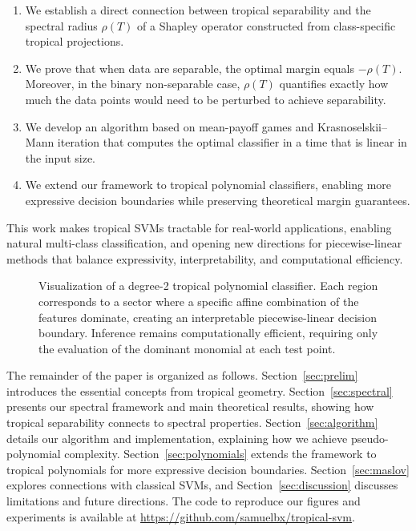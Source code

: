 \documentclass{article}
\begin{document}
\begin{enumerate}
    \item We establish a direct connection between tropical separability and the spectral radius $\rho(T)$ of a Shapley operator constructed from class-specific tropical projections.
    
    \item We prove that when data are separable, the optimal margin equals $-\rho(T)$. Moreover, in the binary non-separable case, $\rho(T)$ quantifies exactly how much the data points would need to be perturbed to achieve separability.
    
    \item We develop an algorithm based on mean-payoff games and Krasnoselskii--Mann iteration that computes the optimal classifier in a time that is linear in the input size. %
    
    \item We extend our framework to tropical polynomial classifiers, enabling more expressive decision boundaries while preserving theoretical margin guarantees.
\end{enumerate}

This work makes tropical SVMs tractable for real-world applications, enabling natural multi-class classification, and opening new directions for piecewise-linear methods that balance expressivity, interpretability, and computational efficiency.

\begin{figure}[h]
    \centering
    \resizebox{0.99\textwidth}{!}{\clipbox{0.15\width{} 0.30\height{} 0.15\width{} 0.30\height{}}{}}
    \caption{Visualization of a degree-2 tropical polynomial classifier. Each region corresponds to a sector where a specific affine combination of the features dominate, creating an interpretable piecewise-linear decision boundary. Inference remains computationally efficient, requiring only the evaluation of the dominant monomial at each test point.}
    \label{fig:tropical_hyperplane}
\end{figure}

The remainder of the paper is organized as follows. Section~\ref{sec:prelim} introduces the essential concepts from tropical geometry. Section~\ref{sec:spectral} presents our spectral framework and main theoretical results, showing how tropical separability connects to spectral properties. Section~\ref{sec:algorithm} details our algorithm and implementation, explaining how we achieve pseudo-polynomial complexity. Section~\ref{sec:polynomials} extends the framework to tropical polynomials for more expressive decision boundaries. Section~\ref{sec:maslov} explores connections with classical SVMs, and Section~\ref{sec:discussion} discusses limitations and future directions. The code to reproduce our figures and experiments is available at \url{https://github.com/samuelbx/tropical-svm}.
\end{document}
